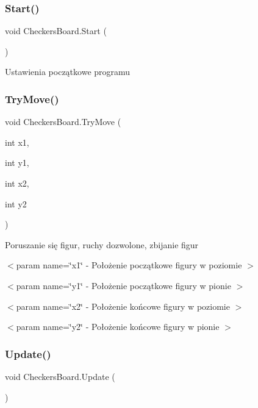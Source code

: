 \subsubsection{\texorpdfstring{Start()}{Start()}}
{\footnotesize\ttfamily void Checkers\+Board.\+Start (\begin{DoxyParamCaption}{ }\end{DoxyParamCaption})\hspace{0.3cm}{\ttfamily [private]}}



Ustawienia początkowe programu 

\mbox{\label{class_checkers_board_adc47a5016166e41a7848549af77bb993}} 
\subsubsection{\texorpdfstring{TryMove()}{TryMove()}}
{\footnotesize\ttfamily void Checkers\+Board.\+Try\+Move (\begin{DoxyParamCaption}\item[{int}]{x1,  }\item[{int}]{y1,  }\item[{int}]{x2,  }\item[{int}]{y2 }\end{DoxyParamCaption})\hspace{0.3cm}{\ttfamily [private]}}



Poruszanie się figur, ruchy dozwolone, zbijanie figur 

$<$param name=\char`\"{}x1\char`\"{} -\/ Położenie początkowe figury w poziomie $>$

$<$param name=\char`\"{}y1\char`\"{} -\/ Położenie początkowe figury w pionie $>$

$<$param name=\char`\"{}x2\char`\"{} -\/ Położenie końcowe figury w poziomie $>$

$<$param name=\char`\"{}y2\char`\"{} -\/ Położenie końcowe figury w pionie $>$\mbox{\label{class_checkers_board_acb916ec6544b35e39f2eba5f855eed73}} 
\subsubsection{\texorpdfstring{Update()}{Update()}}
{\footnotesize\ttfamily void Checkers\+Board.\+Update (\begin{DoxyParamCaption}{ }\end{DoxyParamCaption})\hspace{0.3cm}{\ttfamily [private]}}




